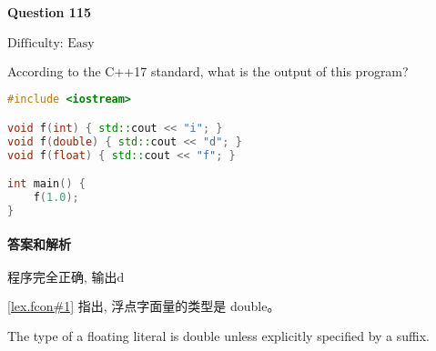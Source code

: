 \documentclass{article}
\begin{document}
	\paragraph*{Question 115} $\boxed{\text{Difficulty: Easy}} $
	
	According to the C++17 standard, what is the output of this program?	
			
	\begin{lstlisting}[language=C++]
#include <iostream>

void f(int) { std::cout << "i"; }
void f(double) { std::cout << "d"; }
void f(float) { std::cout << "f"; }

int main() {
	f(1.0);
}
	\end{lstlisting}
	\paragraph*{答案和解析} $\boxed{\text{程序完全正确, 输出d}} $
	
	\href{https://timsong-cpp.github.io/cppwp/n4659/lex.fcon#1}{[lex.fcon\#1]} 指出, 浮点字面量的类型是 double。
	
	\begin{lightgrayleftbar}
		The type of a floating literal is double unless explicitly specified by a suffix.
	\end{lightgrayleftbar}
\end{document}
